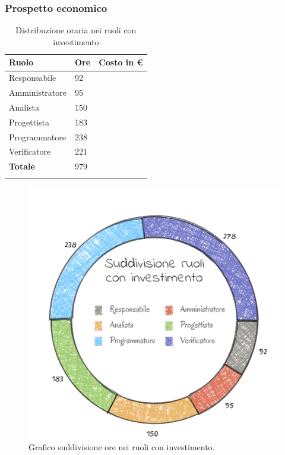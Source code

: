 \subsubsection{Prospetto economico}

\begin{longtable}{| C{.30\textwidth}| C{.15\textwidth}| C{.20\textwidth}|}
\hline
\textbf{Ruolo} & \textbf{Ore} & \textbf{Costo in \euro} \\
\hline 
Responsabile & 92 & \\
\hline
Amministratore & 95 &  \\
\hline
Analista & 150 &  \\
\hline 
Progettista & 183 & \\
\hline
Programmatore & 238 &  \\
\hline
Verificatore & 221 &  \\
\hline
\textbf{Totale} & 979 &  \\
\hline
\caption{Distribuzione oraria nei ruoli con investimento}
\label{Distribuzione oraria ruoli con investimento}
\end{longtable}

\begin{figure}[H]
	\centering
  		\includegraphics[width=0.8\linewidth]{./images/torta_srci.png}
  		\caption{Grafico suddivisione ore nei ruoli con investimento.}
  		\label{fig:grafico suddivione ruoli con investimento}
\end{figure}



